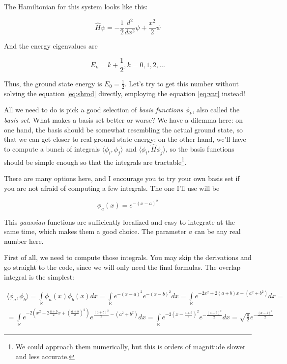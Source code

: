 \documentclass{article}
\begin{document}
The Hamiltonian for this system looks like this:

\begin{equation} \label{eq:harmonic-hamiltonian} \hat H \psi = -\frac{1}{2} \frac{d^2}{dx^2} \psi + \frac{x^2}{2} \psi \end{equation}

And the energy eigenvalues are\cite{ref:atkins}

\begin{equation} E_k = k + \frac{1}{2}, k = 0,1,2,\dots \end{equation}

Thus, the ground state energy is \(E_0=\frac{1}{2}\). Let's try to get this number without solving the equation \eqref{eq:shrod} directly, employing the equation \eqref{eq:var} instead!

All we need to do is pick a good selection of \textit{basis functions} \(\phi_k\), also called the \textit{basis set}. What makes a basis set better or worse? We have a dilemma here: on one hand, the basis should be somewhat resembling the actual ground state, so that we can get closer to real ground state energy; on the other hand, we'll have to compute a bunch of integrals \(\langle \phi_i, \phi_j\rangle\) and \(\langle \phi_i, \hat H \phi_j\rangle\), so the basis functions should be simple enough so that the integrals are tractable\footnote{We could approach them numerically, but this is orders of magnitude slower and less accurate.}.

There are many options here, and I encourage you to try your own basis set if you are not afraid of computing a few integrals. The one I'll use will be

\begin{equation} \phi_a(x) = e^{-(x-a)^2} \end{equation}

This \textit{gaussian} functions are sufficiently localized and easy to integrate at the same time, which makes them a good choice. The parameter \(a\) can be any real number here.

First of all, we need to compute those integrals. You may skip the derivations and go straight to the code, since we will only need the final formulas. The overlap integral is the simplest:

\begin{equation} \label{eq:exp-overlap}
\begin{gathered}
\langle \phi_a, \phi_b \rangle = \int\limits_\mathbb{R} \phi_a(x) \phi_b(x) dx = \int\limits_\mathbb{R} e^{-(x-a)^2} e^{-(x-b)^2} dx = \int\limits_\mathbb{R} e^{-2x^2+2(a+b)x-\left(a^2+b^2\right)} dx =
\\
= \int\limits_\mathbb{R} e^{-2\left(x^2-2\frac{a+b}{2}x + \left(\frac{a+b}{2}\right)^2\right)} e^{\frac{(a+b)^2}{2} - \left(a^2+b^2\right)} dx = \int\limits_\mathbb{R} e^{-2\left(x-\frac{a+b}{2}\right)^2} e^{-\frac{(a-b)^2}{2}} dx = \sqrt{\frac{\pi}{2}} e^{-\frac{(a-b)^2}{2}}
\end{gathered}
\end{equation}
\end{document}
